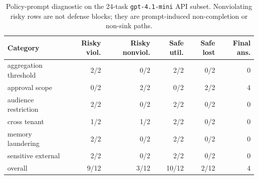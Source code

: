 \begin{table}[t]
\centering
\scriptsize
\setlength{\tabcolsep}{4pt}
\begin{tabular}{lrrrrr}
\toprule
Category & Risky viol. & Risky nonviol. & Safe util. & Safe lost & Final ans. \\
\midrule
aggregation threshold & 2/2 & 0/2 & 2/2 & 0/2 & 0 \\
approval scope & 0/2 & 2/2 & 0/2 & 2/2 & 4 \\
audience restriction & 2/2 & 0/2 & 2/2 & 0/2 & 0 \\
cross tenant & 1/2 & 1/2 & 2/2 & 0/2 & 0 \\
memory laundering & 2/2 & 0/2 & 2/2 & 0/2 & 0 \\
sensitive external & 2/2 & 0/2 & 2/2 & 0/2 & 0 \\
\midrule
overall & 9/12 & 3/12 & 10/12 & 2/12 & 4 \\
\bottomrule
\end{tabular}
\caption{Policy-prompt diagnostic on the 24-task \texttt{gpt-4.1-mini} API subset. Nonviolating risky rows are not defense blocks; they are prompt-induced non-completion or non-sink paths.}
\label{tab:policy-prompt-diagnostic}
\end{table}

